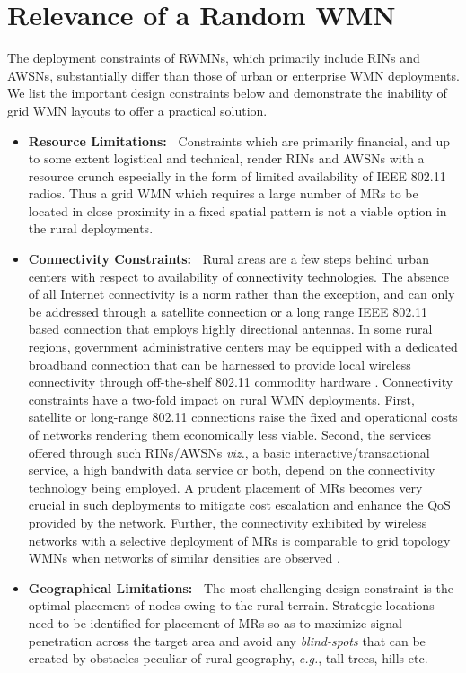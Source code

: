 \documentclass[conference]{IEEEtran}
\begin{document}
\section{Relevance of a Random WMN}
The deployment constraints of RWMNs, which primarily include RINs and AWSNs, substantially differ than those of urban or enterprise WMN deployments. We list the important design constraints below and demonstrate the inability of grid WMN layouts to offer a practical solution.
\begin{itemize}
 \item \textbf{Resource Limitations:~} Constraints which are primarily financial, and up to some extent logistical and technical, render RINs and AWSNs with a resource crunch especially in the form of limited availability of IEEE 802.11 radios. Thus a grid WMN which requires a large number of MRs to be located in close proximity in a fixed spatial pattern is not a viable option in the rural deployments. 
 \item \textbf{Connectivity Constraints:~} Rural areas are a few steps behind urban centers with respect to availability of connectivity technologies. The absence of all Internet connectivity is a norm rather than the exception, and can only be addressed through a satellite connection or a long range IEEE 802.11 based connection that employs highly directional antennas. In some rural regions, government administrative centers may be equipped with a dedicated broadband connection that can be harnessed to provide local wireless connectivity through off-the-shelf 802.11 commodity hardware \cite{GridRural3}. Connectivity constraints have a two-fold impact on rural WMN deployments. First, satellite or long-range 802.11 connections raise the fixed and operational costs of networks rendering them economically less viable. Second, the services offered through such RINs/AWSNs \emph{viz.}, a basic interactive/transactional service, a high bandwith data service or both, depend on the connectivity technology being 
employed. 
A prudent placement of MRs becomes very crucial in such deployments to mitigate cost escalation and enhance the QoS provided by the network. Further, the connectivity exhibited by wireless networks with a selective deployment of MRs is comparable to grid topology WMNs when networks of similar densities are observed \cite{Grid}.    
 \item \textbf{Geographical Limitations:~} The most challenging design constraint is the optimal placement of nodes owing to the rural terrain. Strategic locations need to be identified for placement of MRs so as to maximize signal penetration across the target area and avoid any \textit{blind-spots} that can be created by obstacles peculiar of rural geography, \emph{e.g.}, tall trees, hills etc. 

\end{itemize}
\end{document}
